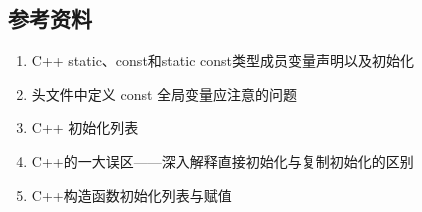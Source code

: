 \documentclass[letterpaper,10pt,english]{sphinxmanual}
\begin{document}
\subsection{参考资料}
\label{\detokenize{cpp/16_staticconst:id2}}\begin{enumerate}
\item {} 
C++ static、const和static const类型成员变量声明以及初始化

\end{enumerate}
\begin{quote}

\end{quote}
\begin{enumerate}
\setcounter{enumi}{1}
\item {} 
头文件中定义 const 全局变量应注意的问题

\end{enumerate}
\begin{quote}

\end{quote}
\begin{enumerate}
\setcounter{enumi}{2}
\item {} 
C++ 初始化列表

\end{enumerate}
\begin{quote}

\end{quote}
\begin{enumerate}
\setcounter{enumi}{3}
\item {} 
C++的一大误区——深入解释直接初始化与复制初始化的区别

\end{enumerate}
\begin{quote}

\end{quote}
\begin{enumerate}
\setcounter{enumi}{4}
\item {} 
C++构造函数初始化列表与赋值

\end{enumerate}
\begin{quote}


\end{quote}
\end{document}
